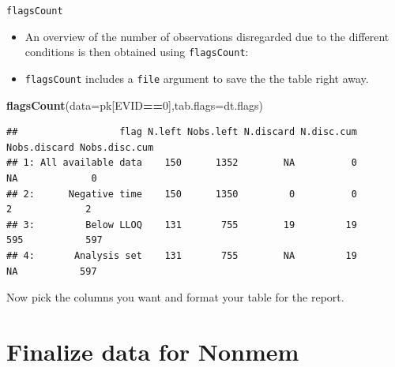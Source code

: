 \documentclass[
  8pt,
  ignorenonframetext,
  aspectratio=169]{beamer}
\newenvironment{Shaded}{\begin{snugshade}}{\end{snugshade}}
\newcommand{\DataTypeTok}[1]{\textcolor[rgb]{0.13,0.29,0.53}{#1}}
\newcommand{\DecValTok}[1]{\textcolor[rgb]{0.00,0.00,0.81}{#1}}
\newcommand{\KeywordTok}[1]{\textcolor[rgb]{0.13,0.29,0.53}{\textbf{#1}}}
\newcommand{\NormalTok}[1]{#1}
\newcommand{\OperatorTok}[1]{\textcolor[rgb]{0.81,0.36,0.00}{\textbf{#1}}}
\begin{document}
\begin{frame}[fragile]{\texttt{flagsCount}}
\protect\hypertarget{flagscount}{}
\begin{itemize}
\item
  An overview of the number of observations disregarded due to the
  different conditions is then obtained using \texttt{flagsCount}:
\item
  \texttt{flagsCount} includes a \texttt{file} argument to save the the
  table right away.
\end{itemize}

\footnotesize

\begin{Shaded}
\begin{Highlighting}[]
\KeywordTok{flagsCount}\NormalTok{(}\DataTypeTok{data=}\NormalTok{pk[EVID}\OperatorTok{==}\DecValTok{0}\NormalTok{],}\DataTypeTok{tab.flags=}\NormalTok{dt.flags)}
\end{Highlighting}
\end{Shaded}

\begin{verbatim}
##                  flag N.left Nobs.left N.discard N.disc.cum Nobs.discard Nobs.disc.cum
## 1: All available data    150      1352        NA          0           NA             0
## 2:      Negative time    150      1350         0          0            2             2
## 3:         Below LLOQ    131       755        19         19          595           597
## 4:       Analysis set    131       755        NA         19           NA           597
\end{verbatim}

Now pick the columns you want and format your table for the report.
\end{frame}

\hypertarget{finalize-data-for-nonmem}{%
\section{Finalize data for Nonmem}\label{finalize-data-for-nonmem}}
\end{document}
